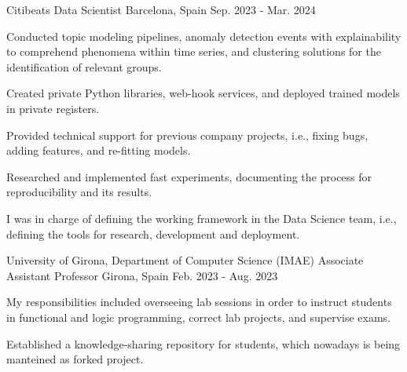 

\begin{cventries}


  \cventry
  {Citibeats} %
  {Data Scientist} %
  {Barcelona, Spain} %
  {Sep. 2023 - Mar. 2024} %
  {
  \begin{cvitems}
    \item {Conducted topic modeling pipelines, anomaly detection events with
      explainability to comprehend phenomena within time series, and clustering
    solutions for the identification of relevant groups.}
    \item {Created private Python libraries, web-hook services, and deployed
      trained models in private registers.}
    \item {Provided technical support for previous company projects, i.e., fixing
      bugs, adding features, and re-fitting models.}
    \item {Researched and implemented fast experiments, documenting the process for
      reproducibility and its results.}
    \item {I was in charge of defining the working framework in the Data
      Science team, i.e., defining the tools for research, development and deployment.}
  \end{cvitems}
}


  \cventry
  {University of Girona, Department of Computer Science (IMAE)} %
  {Associate Assistant Professor} %
  {Girona, Spain} %
  {Feb. 2023 - Aug. 2023} %
  {
    \begin{cvitems} %
    \item {My responsibilities included overseeing lab
      sessions in order to instruct students in functional and logic programming,
    correct lab projects, and supervise exams.}
    \item{Established a knowledge-sharing repository for students, which nowadays is being manteined as forked project.}
    \end{cvitems}
    }



\end{cventries}
